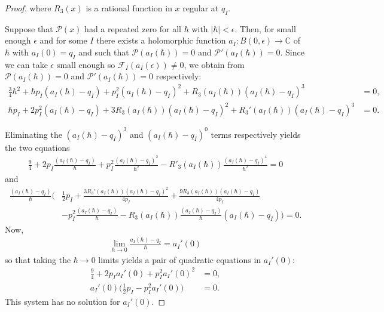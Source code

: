 \documentclass[a4paper,12pt,reqno]{amsart}
\numberwithin{equation}{section}
\numberwithin{counter2}{section}
\begin{document}
\begin{proof}
where $R_3(x)$ is a rational function in $x$ regular at $q_I$.  \par Suppose that $\mathcal{P}(x)$ had a repeated zero for all $\hbar$ with $|\hbar| < \epsilon$.  Then,  for small enough $\epsilon$ and for some $I$ there exists a holomorphic function $a_I: B(0,\epsilon) \to \mathbb{C}$ of $\hbar$ with $a_I(0) = q_I$ and such that $\mathcal{P}(a_I(\hbar)) = 0$ and $\mathcal{P}'(a_I(\hbar)) = 0$.  Since we can take $\epsilon$ small enough so $\mathcal{F}_I(a_I(\epsilon)) \ne 0$,  we obtain from $\mathcal{P}(a_I(\hbar)) = 0$ and $\mathcal{P}'(a_I(\hbar)) = 0$ respectively:
\begin{align}
\frac{3}{4}\hbar^2 + \hbar p_I(a_I(\hbar) - q_I) + p_I^2(a_I(\hbar)-q_I)^2 + R_3(a_I(\hbar))  (a_I(\hbar)-q_I)^3 &= 0, \\ 
\hbar p_I + 2p_I^2(a_I(\hbar)-q_I) + 3R_3(a_I(\hbar)) (a_I(\hbar)-q_I)^2 + R_3'(a_I(\hbar)) (a_I(\hbar)-q_I)^3 &= 0.
\end{align}

Eliminating the $(a_I(\hbar)-q_I)^3$ and $(a_I(\hbar)-q_I)^0$ terms respectively yields the two equations
\begin{align}
\frac{9}{4} + 2p_I\frac{(a_I(\hbar)-q_I)}{\hbar} + p_I^2\frac{(a_I(\hbar)-q_I)^2}{\hbar^2} - R'_3(a_I(\hbar))\frac{(a_I(\hbar)-q_I)^4}{\hbar^2} = 0
\end{align}
and
\begin{align}
\frac{(a_I(\hbar)-q_I)}{\hbar}\Bigg(&\frac{1}{2}p_I + \frac{3R_3'(a_I(\hbar))(a_I(\hbar)-q_I)^2}{4p_I} + \frac{9R_3(a_I(\hbar))(a_I(\hbar)-q_I)}{4p_I} \nonumber \\  
& - p_I^2 \frac{(a_I(\hbar)-q_I)}{\hbar} - R_3(a_I(\hbar))\frac{(a_I(\hbar)-q_I)}{\hbar}(a_I(\hbar)-q_I)\Bigg) = 0.  
\end{align}
Now,  
\begin{align}
\lim_{\hbar \to 0} \frac{a_I(\hbar) - q_I}{\hbar} = a_I'(0)
\end{align}
so that taking the $\hbar \to 0$ limits yields a pair of quadratic equations in $ a_I'(0)$:
\begin{align}
\frac{9}{4} + 2p_Ia_I'(0) + p_I^2a_I'(0)^2  &= 0,  \\ 
a_I'(0)\bigg(\frac{1}{2}p_I  - p_I^2 a_I'(0) \bigg) &= 0.  
\end{align}
This system has no solution for $a_I'(0)$.  \end{proof}
\end{document}
